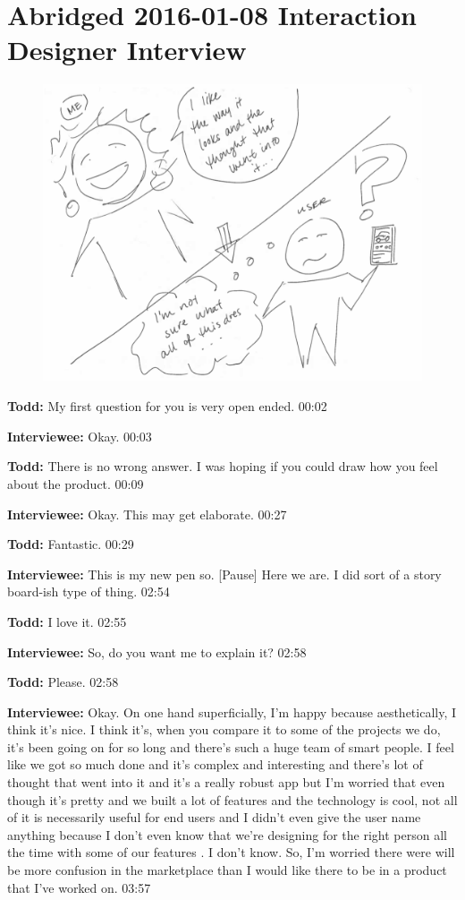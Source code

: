 \section{Abridged 2016-01-08 Interaction Designer Interview}

\begin{figure}[h]
\centering
\includegraphics[width=6.5in]{interviews/drawings/2016_01_08.png}
\caption{}
\label{2016_01_08}
\end{figure}

\textbf{Todd:} My first question for you is very open ended.  00:02

\textbf{Interviewee:} Okay.  00:03

\textbf{Todd:} There is no wrong answer.  I was hoping if you could draw how you feel about the product.  00:09

\textbf{Interviewee:} Okay.  This may get elaborate.  00:27

\textbf{Todd:} Fantastic.  00:29

\textbf{Interviewee:} This is my new pen so.  [Pause] Here we are.  I did sort of a story board-ish type of thing.  02:54

\textbf{Todd:} I love it.  02:55

\textbf{Interviewee:} So, do you want me to explain it?  02:58

\textbf{Todd:} Please.  02:58

\textbf{Interviewee:} Okay.  On one hand superficially, I'm happy because aesthetically, I think it's nice.  I think it's, when you compare it to some of the projects we do, it's been going on for so long and there's such a huge team of smart people.  I feel like we got so much done and it's complex and interesting and there's lot of thought that went into it and it's a really robust app but I'm worried that even though it's pretty and we built a lot of features and the technology is cool, not all of it is necessarily useful for end users and I didn't even give the user name anything because I don't even know that we're designing for the right person all the time with some of our features .  I don't know.  So, I'm worried there were will be more confusion in the marketplace than I would like there to be in a product that I've worked on.  03:57

